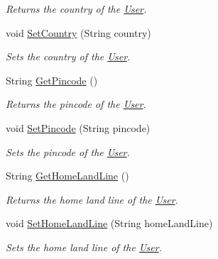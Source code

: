 \begin{DoxyCompactItemize}
\begin{DoxyCompactList}\small\item\em Returns the country of the \hyperlink{classcom_1_1shephertz_1_1app42_1_1paas_1_1sdk_1_1csharp_1_1user_1_1_user}{User}. \end{DoxyCompactList}\item 
void \hyperlink{classcom_1_1shephertz_1_1app42_1_1paas_1_1sdk_1_1csharp_1_1user_1_1_user_1_1_profile_a387cc09136329ebdb2ec30af498b6338}{Set\+Country} (String country)
\begin{DoxyCompactList}\small\item\em Sets the country of the \hyperlink{classcom_1_1shephertz_1_1app42_1_1paas_1_1sdk_1_1csharp_1_1user_1_1_user}{User}. \end{DoxyCompactList}\item 
String \hyperlink{classcom_1_1shephertz_1_1app42_1_1paas_1_1sdk_1_1csharp_1_1user_1_1_user_1_1_profile_a909844959aafaa5f1ec756ae49afcf9e}{Get\+Pincode} ()
\begin{DoxyCompactList}\small\item\em Returns the pincode of the \hyperlink{classcom_1_1shephertz_1_1app42_1_1paas_1_1sdk_1_1csharp_1_1user_1_1_user}{User}. \end{DoxyCompactList}\item 
void \hyperlink{classcom_1_1shephertz_1_1app42_1_1paas_1_1sdk_1_1csharp_1_1user_1_1_user_1_1_profile_a5f03513861df1e1c27e94a19ea9a2660}{Set\+Pincode} (String pincode)
\begin{DoxyCompactList}\small\item\em Sets the pincode of the \hyperlink{classcom_1_1shephertz_1_1app42_1_1paas_1_1sdk_1_1csharp_1_1user_1_1_user}{User}. \end{DoxyCompactList}\item 
String \hyperlink{classcom_1_1shephertz_1_1app42_1_1paas_1_1sdk_1_1csharp_1_1user_1_1_user_1_1_profile_a43032c7fdd4f4dd39961766d78ab46bc}{Get\+Home\+Land\+Line} ()
\begin{DoxyCompactList}\small\item\em Returns the home land line of the \hyperlink{classcom_1_1shephertz_1_1app42_1_1paas_1_1sdk_1_1csharp_1_1user_1_1_user}{User}. \end{DoxyCompactList}\item 
void \hyperlink{classcom_1_1shephertz_1_1app42_1_1paas_1_1sdk_1_1csharp_1_1user_1_1_user_1_1_profile_a8221d200514c3c7f654f2f1d8c0b564f}{Set\+Home\+Land\+Line} (String home\+Land\+Line)
\begin{DoxyCompactList}\small\item\em Sets the home land line of the \hyperlink{classcom_1_1shephertz_1_1app42_1_1paas_1_1sdk_1_1csharp_1_1user_1_1_user}{User}. \end{DoxyCompactList}\item 

\end{DoxyCompactItemize}
